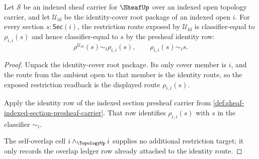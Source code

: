 \begin{theorem}
\label{thm:sheaf-identity-cover-restriction-readback}
Let $\mathcal{S}$ be an indexed sheaf carrier for $\SheafUp$ over an indexed open topology carrier, and let $\mathcal{U}_{\mathrm{id}}$ be the identity-cover root package of an indexed open $i$. For every section $s:\mathsf{Sec}(i)$, the restriction route exposed by $\mathcal{U}_{\mathrm{id}}$ is classifier-equal to $\rho_{i,i}(s)$ and hence classifier-equal to $s$ by the presheaf identity row:
$$
\rho^{\mathcal{U}_{\mathrm{id}}}(s)\sim_i\rho_{i,i}(s),
\qquad
\rho_{i,i}(s)\sim_i s.
$$
\end{theorem}
\begin{proof}
Unpack the identity-cover root package. Its only cover member is $i$, and the route from the ambient open to that member is the identity route, so the exposed restriction readback is the displayed route $\rho_{i,i}(s)$.

Apply the identity row of the indexed section presheaf carrier from \autoref{def:sheaf-indexed-section-presheaf-carrier}. That row identifies $\rho_{i,i}(s)$ with $s$ in the classifier $\sim_i$.

The self-overlap cell $i\wedge_{\TopologyUp}i$ supplies no additional restriction target; it only records the overlap ledger row already attached to the identity route.
\end{proof}

